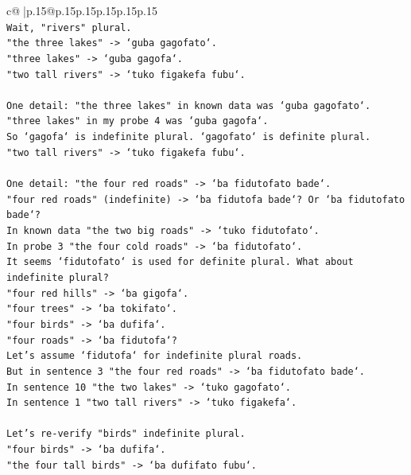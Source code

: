 \documentclass{article}
\begin{document}
{\begin{supertabular}{c@{$\;$}|p{.15\linewidth}@{}p{.15\linewidth}p{.15\linewidth}p{.15\linewidth}p{.15\linewidth}p{.15\linewidth}}
{{{\\ 
\texttt{Wait, "rivers" plural.} \\
\texttt{"the three lakes" {-}> `guba gagofato`.} \\
\texttt{"three lakes" {-}> `guba gagofa`.} \\
\texttt{"two tall rivers" {-}> `tuko figakefa fubu`.} \\
\\ 
\texttt{One detail: "the three lakes" in known data was `guba gagofato`.} \\
\texttt{"three lakes" in my probe 4 was `guba gagofa`.} \\
\texttt{So `gagofa` is indefinite plural. `gagofato` is definite plural.} \\
\texttt{"two tall rivers" {-}> `tuko figakefa fubu`.} \\
\\ 
\texttt{One detail: "the four red roads" {-}> `ba fidutofato bade`.} \\
\texttt{"four red roads" (indefinite) {-}> `ba fidutofa bade`? Or `ba fidutofato bade`?} \\
\texttt{In known data "the two big roads" {-}> `tuko fidutofato`.} \\
\texttt{In probe 3 "the four cold roads" {-}> `ba fidutofato`.} \\
\texttt{It seems `fidutofato` is used for definite plural. What about indefinite plural?} \\
\texttt{"four red hills" {-}> `ba gigofa`.} \\
\texttt{"four trees" {-}> `ba tokifato`.} \\
\texttt{"four birds" {-}> `ba dufifa`.} \\
\texttt{"four roads" {-}> `ba fidutofa`?} \\
\texttt{Let's assume `fidutofa` for indefinite plural roads.} \\
\texttt{But in sentence 3 "the four red roads" {-}> `ba fidutofato bade`.} \\
\texttt{In sentence 10 "the two lakes" {-}> `tuko gagofato`.} \\
\texttt{In sentence 1 "two tall rivers" {-}> `tuko figakefa`.} \\
\\ 
\texttt{Let's re{-}verify "birds" indefinite plural.} \\
\texttt{"four birds" {-}> `ba dufifa`.} \\
\texttt{"the four tall birds" {-}> `ba dufifato fubu`.} \\
}}}
\end{supertabular}}
\end{document}

